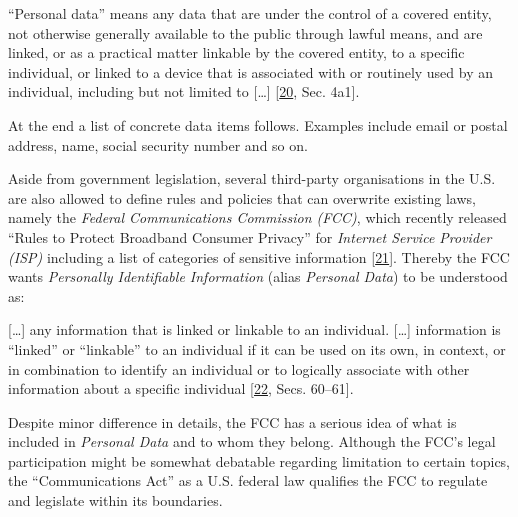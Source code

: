 \documentclass[12pt,english,a4paper,titlepage,cleardoublepage=empty,dottedtoc]{report}
\let\origquote\quote
\let\endorigquote\endquote
\renewenvironment{quote}{%
    \origquote
    \itshape
}
{\endorigquote}
\begin{document}
\begin{quote}
``Personal data'' means any data that are under the control of a covered
entity, not otherwise generally available to the public through lawful
means, and are linked, or as a practical matter linkable by the covered
entity, to a specific individual, or linked to a device that is
associated with or routinely used by an individual, including but not
limited to {[}\ldots{}{]}
{[}\protect\hyperlink{ref-bill-draft_2015_us_consumer-privacy-bill-of-rights-act_definition}{20},
Sec. 4a1{]}.
\end{quote}

At the end a list of concrete data items follows. Examples include email
or postal address, name, social security number and so on.

Aside from government legislation, several third-party organisations in
the U.S. are also allowed to define rules and policies that can
overwrite existing laws, namely the \emph{Federal Communications
Commission (FCC)}, which recently released ``Rules to Protect Broadband
Consumer Privacy'' for \emph{Internet Service Provider (ISP)} including
a list of categories of sensitive information
{[}\protect\hyperlink{ref-rules_2016_fcc_to-protect-broadband-consumer-privacy_sensitive-types-of-data}{21}{]}.
Thereby the FCC wants \emph{Personally Identifiable Information} (alias
\emph{Personal Data}) to be understood as:

\begin{quote}
{[}\ldots{}{]} any information that is linked or linkable to an
individual. {[}\ldots{}{]} information is ``linked'' or ``linkable'' to
an individual if it can be used on its own, in context, or in
combination to identify an individual or to logically associate with
other information about a specific individual
{[}\protect\hyperlink{ref-rules_2016_fcc_to-protect-broadband-consumer-privacy_personally-identifiable-information}{22},
Secs. 60--61{]}.
\end{quote}

Despite minor difference in details, the FCC has a serious idea of what
is included in \emph{Personal Data} and to whom they belong. Although
the FCC's legal participation might be somewhat debatable regarding
limitation to certain topics, the ``Communications Act'' as a U.S.
federal law qualifies the FCC to regulate and legislate within its
boundaries.
\end{document}

